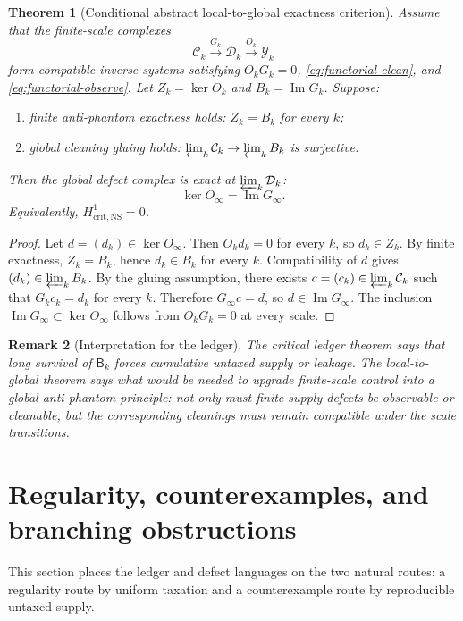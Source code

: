 \documentclass[11pt]{article}
\numberwithin{equation}{section}
\newtheorem{theorem}{Theorem}[section]
\newtheorem{remark}[theorem]{Remark}
\newcommand{\Bbad}{\mathsf B}
\newcommand{\NS}{\mathrm{NS}}
\newcommand{\crit}{\mathrm{crit}}
\newcommand{\calC}{\mathcal C}
\newcommand{\calD}{\mathcal D}
\newcommand{\calY}{\mathcal Y}
\newcommand{\Image}{\operatorname{Im}}
\begin{document}
\begin{theorem}[Conditional abstract local-to-global exactness criterion]\label{thm:local-to-global}
Assume that the finite-scale complexes
\[
    \calC_k\xrightarrow{G_k}\calD_k\xrightarrow{O_k}\calY_k
\]
form compatible inverse systems satisfying \(O_kG_k=0\),
\eqref{eq:functorial-clean}, and \eqref{eq:functorial-observe}.  Let
$Z_k=\ker O_k$ and $B_k=\Image G_k$.  Suppose:
\begin{enumerate}[label=(\roman*),leftmargin=2em]
    \item finite anti-phantom exactness holds: $Z_k=B_k$ for every $k$;
    \item global cleaning gluing holds: $\varprojlim_k \calC_k\to \varprojlim_k B_k$ is surjective.
\end{enumerate}
Then the global defect complex is exact at $\varprojlim_k\calD_k$:
\[
    \ker O_\infty=\Image G_\infty.
\]
Equivalently, $H^1_{\crit,\NS}=0$.
\end{theorem}

\begin{proof}
Let $d=(d_k)\in\ker O_\infty$.  Then $O_kd_k=0$ for every $k$, so $d_k\in Z_k$.  By finite exactness, $Z_k=B_k$, hence $d_k\in B_k$ for every $k$.  Compatibility of $d$ gives $(d_k)\in\varprojlim_k B_k$.  By the gluing assumption, there exists $c=(c_k)\in\varprojlim_k\calC_k$ such that $G_kc_k=d_k$ for every $k$.  Therefore $G_\infty c=d$, so $d\in\Image G_\infty$.  The inclusion $\Image G_\infty\subset\ker O_\infty$ follows from $O_kG_k=0$ at every scale.
\end{proof}

\begin{remark}[Interpretation for the ledger]
The critical ledger theorem says that long survival of $\Bbad_k$ forces cumulative untaxed supply or leakage.  The local-to-global theorem says what would be needed to upgrade finite-scale control into a global anti-phantom principle: not only must finite supply defects be observable or cleanable, but the corresponding cleanings must remain compatible under the scale transitions.
\end{remark}

\section{Regularity, counterexamples, and branching obstructions}\label{sec:regularity-counterexample}
\noindent This section places the ledger and defect languages on the two natural routes: a regularity route by uniform taxation and a counterexample route by reproducible untaxed supply.
\end{document}
